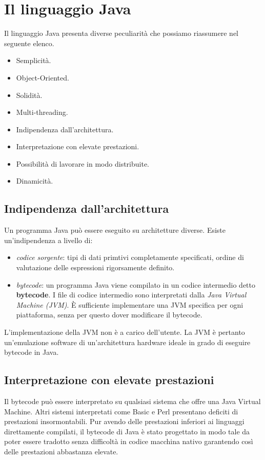 \documentclass[12pt]{report}
\begin{document}
\chapter{Il linguaggio Java}
Il linguaggio Java presenta diverse peculiarità che possiamo riassumere nel seguente elenco.
\begin{itemize}
	\item Semplicità.
	\item Object-Oriented.
	\item Solidità.
	\item Multi-threading.
	\item Indipendenza dall'architettura.
	\item Interpretazione con elevate prestazioni.
	\item Possibilità di lavorare in modo distribuite.
	\item Dinamicità.
\end{itemize}
\section{Indipendenza dall'architettura}
Un programma Java può essere eseguito su architetture diverse. Esiste un'indipendenza a livello di:
\begin{itemize}
	\item \textit{codice sorgente}: tipi di dati primtivi completamente specificati, ordine di valutazione delle espressioni rigorsamente definito.
	\item \textit{bytecode}: un programma Java viene compilato in un codice intermedio detto \textbf{bytecode}. I file di codice intermedio sono interpretati dalla \textit{Java Virtual Machine (JVM)}. È sufficiente implementare una JVM specifica per ogni piattaforma, senza per questo dover modificare il bytecode.
\end{itemize}
L'implementazione della JVM non è a carico dell'utente. La JVM è pertanto un'emulazione software di un'architettura hardware ideale in grado di eseguire bytecode in Java.
\section{Interpretazione con elevate prestazioni}
Il bytecode può essere interpretato su qualsiasi sistema che offre una Java Virtual Machine. Altri sistemi interpretati come Basic e Perl presentano deficiti di prestazioni insormontabili. Pur avendo delle prestazioni inferiori ai linguaggi direttamente compilati, il bytecode di Java è stato progettato in modo tale da poter essere tradotto senza difficoltà in codice macchina nativo garantendo così delle prestazioni abbastanza elevate.
\end{document}
